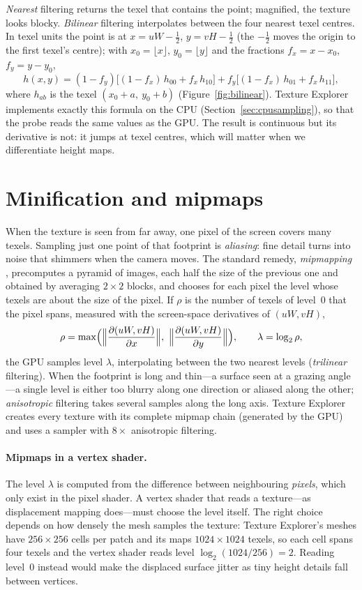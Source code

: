 \emph{Nearest} filtering returns the texel that contains the point; magnified, the texture
looks blocky. \emph{Bilinear} filtering interpolates between the four nearest texel centres.
In texel units the point is at $x = uW - \frac12$, $y = vH - \frac12$ (the $-\frac12$ moves
the origin to the first texel's centre); with $x_0=\lfloor x\rfloor$, $y_0=\lfloor y\rfloor$
and the fractions $f_x = x - x_0$, $f_y = y - y_0$,
\[
  h(x,y) = (1-f_y)\bigl[(1-f_x)\,h_{00} + f_x\,h_{10}\bigr] + f_y\bigl[(1-f_x)\,h_{01} + f_x\,h_{11}\bigr],
\]
where $h_{ab}$ is the texel $(x_0+a,\ y_0+b)$ (Figure~\ref{fig:bilinear}). Texture Explorer
implements exactly this formula on the CPU (Section~\ref{sec:cpusampling}), so that the probe
reads the same values as the GPU. The result is continuous but its derivative is not: it
jumps at texel centres, which will matter when we differentiate height maps.

\section{Minification and mipmaps}
When the texture is seen from far away, one pixel of the screen covers many texels. Sampling
just one point of that footprint is \emph{aliasing}: fine detail turns into noise that
shimmers when the camera moves. The standard remedy, \emph{mipmapping} \cite{williams1983},
precomputes a pyramid of images, each half the size of the previous one and obtained by
averaging $2\times2$ blocks, and chooses for each pixel the level whose texels are about the
size of the pixel. If $\rho$ is the number of texels of level~0 that the pixel spans, measured
with the screen-space derivatives of $(uW, vH)$,
\[
  \rho = \max\Bigl(\Bigl\lVert\dd{(uW,vH)}{x}\Bigr\rVert,\ \Bigl\lVert\dd{(uW,vH)}{y}\Bigr\rVert\Bigr),
  \qquad \lambda = \log_2 \rho ,
\]
the GPU samples level $\lambda$, interpolating between the two nearest levels
(\emph{trilinear} filtering). When the footprint is long and thin---a surface seen at a grazing
angle---a single level is either too blurry along one direction or aliased along the other;
\emph{anisotropic} filtering takes several samples along the long axis. Texture Explorer
creates every texture with its complete mipmap chain (generated by the GPU) and uses a
sampler with $8\times$ anisotropic filtering.

\paragraph{Mipmaps in a vertex shader.} The level $\lambda$ is computed from the difference
between neighbouring \emph{pixels}, which only exist in the pixel shader. A vertex shader that
reads a texture---as displacement mapping does---must choose the level itself. The right
choice depends on how densely the mesh samples the texture: Texture Explorer's meshes have
$256\times256$ cells per patch and its maps $1024\times1024$ texels, so each cell spans four
texels and the vertex shader reads level $\log_2(1024/256)=2$. Reading level~0 instead would
make the displaced surface jitter as tiny height details fall between vertices.

